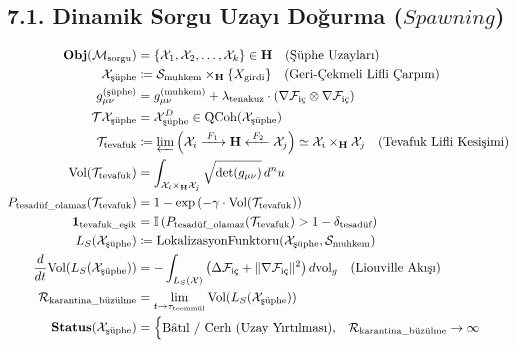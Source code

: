 \documentclass[11pt, a4paper]{article}
\begin{document}
\subsection{7.1. Dinamik Sorgu Uzayı Doğurma ($Spawning$)}
\begin{align}
\mathbf{Obj}(\mathcal{M}_{\text{sorgu}}) &= \{ \mathcal{X}_1, \mathcal{X}_2, \dots, \mathcal{X}_k \} \in \mathbf{H} \quad (\text{Şüphe Uzayları}) \\
\mathcal{X}_{\text{şüphe}} &\coloneqq \mathcal{S}_{\text{muhkem}} \times_{\mathbf{H}} \{ X_{\text{girdi}} \} \quad (\text{Geri-Çekmeli Lifli Çarpım}) \\
g_{\mu\nu}^{(\text{şüphe})} &= g_{\mu\nu}^{(\text{muhkem})} + \lambda_{\text{tenakuz}} \cdot \left( \nabla \mathcal{F}_{\text{iç}} \otimes \nabla \mathcal{F}_{\text{iç}} \right) \\
\mathcal{T}\mathcal{X}_{\text{şüphe}} &= \mathcal{X}_{\text{şüphe}}^D \in \text{QCoh}(\mathcal{X}_{\text{şüphe}}) \\
\mathcal{T}_{\text{tevafuk}} &\coloneqq \varprojlim \left( \mathcal{X}_i \xrightarrow{\;F_1\;} \mathbf{H} \xleftarrow{\;F_2\;} \mathcal{X}_j \right) \simeq \mathcal{X}_i \times_{\mathbf{H}} \mathcal{X}_j \quad (\text{Tevafuk Lifli Kesişimi}) \\
\text{Vol}(\mathcal{T}_{\text{tevafuk}}) &= \int_{\mathcal{X}_i \times_{\mathbf{H}} \mathcal{X}_j} \sqrt{\det(g_{\mu\nu})} \, d^n u \\
P_{\text{tesadüf\_olamaz}}(\mathcal{T}_{\text{tevafuk}}) &= 1 - \exp\left( -\gamma \cdot \text{Vol}(\mathcal{T}_{\text{tevafuk}}) \right) \\
\mathbf{1}_{\text{tevafuk\_eşik}} &= \mathbb{I}\left( P_{\text{tesadüf\_olamaz}}(\mathcal{T}_{\text{tevafuk}}) > 1 - \delta_{\text{tesadüf}} \right) \\
L_S(\mathcal{X}_{\text{şüphe}}) &\coloneqq \text{LokalizasyonFunktoru}(\mathcal{X}_{\text{şüphe}}, \mathcal{S}_{\text{muhkem}}) \\
\frac{d}{dt} \text{Vol}(L_S(\mathcal{X}_{\text{şüphe}})) &= -\int_{L_S(\mathcal{X})} \left( \Delta \mathcal{F}_{\text{iç}} + \|\nabla \mathcal{F}_{\text{iç}}\|^2 \right) d\text{vol}_g \quad (\text{Liouville Akışı}) \\
\mathcal{R}_{\text{karantina\_büzülme}} &= \lim_{t \to \tau_{\text{teemmül}}} \text{Vol}(L_S(\mathcal{X}_{\text{şüphe}})) \\
\mathbf{Status}(\mathcal{X}_{\text{şüphe}}) &= 
\begin{cases}
\text{Bâtıl / Cerh (Uzay Yırtılması)}, & \mathcal{R}_{\text{karantina\_büzülme}} \to \infty \\

\end{cases}
\end{align}
\end{document}
